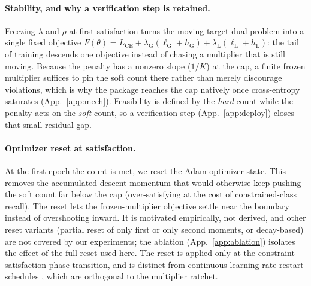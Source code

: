 \documentclass[10pt]{article}
\begin{document}
\paragraph{Stability, and why a verification step is retained.}
Freezing $\lambda$ and $\rho$ at first satisfaction turns the moving-target
dual problem into a single fixed objective
$F(\theta)=L_{\text{CE}}+\lambda_{\mathrm{G}}(\ell_{\mathrm{G}}{+}h_{\mathrm{G}})+\lambda_{\mathrm{L}}(\ell_{\mathrm{L}}{+}h_{\mathrm{L}})$:
the tail of training descends one objective instead of chasing a multiplier
that is still moving. Because the penalty has a nonzero slope ($1/K$) at the
cap, a finite frozen multiplier suffices to pin the soft count there rather
than merely discourage violations, which is why the package reaches the cap
natively once cross-entropy saturates (App.~\ref{app:mech}). Feasibility is
defined by the \emph{hard} count while the penalty acts on the \emph{soft}
count, so a verification step (App.~\ref{app:deploy}) closes that small
residual gap.

\paragraph{Optimizer reset at satisfaction.}
At the first epoch the count is met, we reset the Adam optimizer state. This
removes the accumulated descent momentum that would otherwise keep pushing
the soft count far below the cap (over-satisfying at the cost of
constrained-class recall). The reset lets the frozen-multiplier objective
settle near the boundary instead of overshooting inward. It is motivated
empirically, not derived, and other reset variants (partial reset of only
first or only second moments, or decay-based) are not covered by our
experiments; the ablation (App.~\ref{app:ablation}) isolates the effect of
the full reset used here. The reset is applied only at the
constraint-satisfaction phase transition, and is distinct from continuous
learning-rate restart schedules \citep{loshchilov2017sgdr}, which are
orthogonal to the multiplier ratchet.
\end{document}
